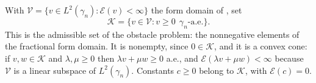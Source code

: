 \begin{definition}
With $\mathcal{V} = \{v \in L^2(\gamma_n) : \mathcal{E}(v) < \infty\}$ the form
domain of , set
\[
  \mathcal{K} = \{v \in \mathcal{V} : v \geq 0 \ \ \gamma_n\text{-a.e.}\} .
\]
This is the admissible set of the obstacle problem: the nonnegative elements of
the fractional form domain.  It is nonempty, since $0 \in \mathcal{K}$, and it is
a convex cone: if $v, w \in \mathcal{K}$ and $\lambda, \mu \geq 0$ then
$\lambda v + \mu w \geq 0$ a.e., and $\mathcal{E}(\lambda v + \mu w) < \infty$
because $\mathcal{V}$ is a linear subspace of $L^2(\gamma_n)$.  Constants
$c \geq 0$ belong to $\mathcal{K}$, with $\mathcal{E}(c) = 0$.
\end{definition}
